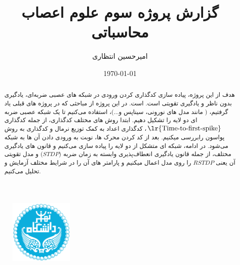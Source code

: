 \documentclass{report}
\title{گزارش پروژه سوم علوم اعصاب محاسباتی}
\author{امیرحسین انتظاری}
\date{\today}
\begin{document}
\begin{figure}
    \centering \includegraphics[height=3cm]{images/Logo.png}
\end{figure}
\renewcommand{\chaptername}{بخش}
\newpage
\maketitle
\newpage
\tableofcontents

    \begin{abstract}
        هدف از این پروژه، پیاده سازی کدگذاری کردن ورودی در شبکه های عصبی ضربه‌ای، یادگیری بدون ناظر و یادگیری تقویتی است.
        است. در این پروژه از مباحثی که در پروژه های قبلی یاد گرفتیم،
        ( مانند مدل های نورونی، سیناپس و...)، 
        استفاده می‌کنیم تا یک شبکه عصبی ضربه ای دو لایه را تشکیل دهیم. ابتدا روش های مختلف کدگذاری، از جمله کدگذاری 
        $\text{\lr{Time-to-first-spike}}$، 
        کدگذاری اعداد به کمک توزیع نرمال و کدگذاری به روش پواسون رابررسی میکنیم. بعد از کد کردن محرک ها، نوبت به ورودی دادن آن ها به شبکه می‌شود. در ادامه، شبکه ای متشکل از دو لایه را پیاده سازی می‌کنیم و قانون های یادگیری مختلف، از جمله قانون یادگیری انعطاف‌پذیری وابسته به زمان ضربه 
        ($STDP$) 
        و مدل تقویتی آن یعنی 
        $RSTDP$ 
        را روی مدل اعمال میکنیم و پارامتر های آن را در شرایط مختلف آزمایش و تحلیل می‌کنیم.
    \end{abstract}
\restoregeometry


\newpage

\newpage



\end{document}
